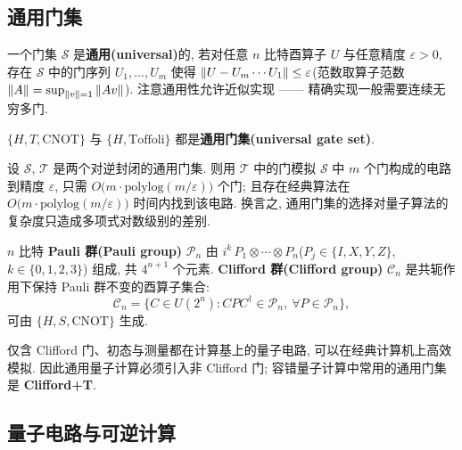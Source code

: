 \documentclass[utf8]{article} %
\numberwithin{equation}{section}   %
\newtheorem{Def}{\hskip 2em {\color{green} 定义}}[subsection]
\newtheorem{Thm}{\hskip 2em {\color{blue} 定理}}[subsection]
\newtheorem{Note}{\hskip 2em {\color{red} 注}}[subsection]
\begin{document}
\subsection{通用门集}

\begin{Def}
    一个门集 $\mathcal{S}$ 是\textbf{通用(universal)}的, 若对任意 $n$ 比特酉算子 $U$ 与任意精度
    $\varepsilon > 0$, 存在 $\mathcal{S}$ 中的门序列 $U_1, \dots, U_m$ 使得
    $\norm{U - U_m\cdots U_1} \le \varepsilon$(范数取算子范数 $\norm{A} = \sup_{\norm{v}=1}\norm{Av}$).
    注意通用性允许近似实现 —— 精确实现一般需要连续无穷多门.
\end{Def}

\begin{Thm}[通用门集的例子]
    $\{H, T, \text{CNOT}\}$ 与 $\{H, \text{Toffoli}\}$ 都是\textbf{通用门集(universal gate set)}.
\end{Thm}

\begin{Thm}
    设 $\mathcal{S}$, $\mathcal{T}$ 是两个对逆封闭的通用门集. 则用 $\mathcal{T}$ 中的门模拟
    $\mathcal{S}$ 中 $m$ 个门构成的电路到精度 $\varepsilon$, 只需 $O\big(m \cdot \mathrm{polylog}(m/\varepsilon)\big)$ 个门;
    且存在经典算法在 $O\big(m \cdot \mathrm{polylog}(m/\varepsilon)\big)$ 时间内找到该电路.
    换言之, 通用门集的选择对量子算法的复杂度只造成多项式对数级别的差别.
\end{Thm}

\begin{Def}
    $n$ 比特 \textbf{Pauli 群(Pauli group)} $\mathcal{P}_n$ 由
    $i^k\, P_1 \otimes \cdots \otimes P_n$($P_j \in \{I, X, Y, Z\}$, $k \in \{0, 1, 2, 3\}$)
    组成, 共 $4^{n+1}$ 个元素.
    \textbf{Clifford 群(Clifford group)} $\mathcal{C}_n$ 是共轭作用下保持 Pauli 群不变的酉算子集合:
    \begin{equation}
        \mathcal{C}_n = \big\{C \in U(2^n) : C P C^\dagger \in \mathcal{P}_n,\ \forall P \in \mathcal{P}_n\big\},
    \end{equation}
    可由 $\{H, S, \text{CNOT}\}$ 生成.
\end{Def}

\begin{Note}
    仅含 Clifford 门、初态与测量都在计算基上的量子电路, 可以在经典计算机上高效模拟.
    因此通用量子计算必须引入非 Clifford 门; 容错量子计算中常用的通用门集是 \textbf{Clifford+T}.
\end{Note}

\subsection{量子电路与可逆计算}
\end{document}

